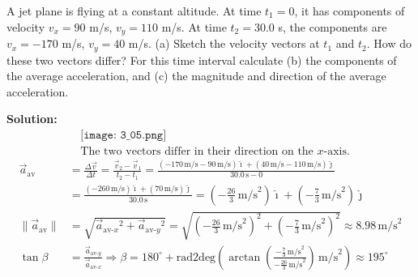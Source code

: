 \documentclass[12pt]{article}
\newenvironment{problem}[2][]{
    \begin{trivlist}
        \item[
            {\bfseries #1}
            {\bfseries #2}
        ]
}{\end{trivlist}}
\newcommand{\solution}{\medskip\noindent\textbf{Solution:}}
\newcommand{\magnitude}[1]{\lVert #1 \rVert}
\newcommand{\UVector}[2]{\left(#1\right)\ihat + \left(#2\right)\jhat}
\newcommand{\ihat}{\hat{\imath}}
\newcommand{\jhat}{\hat{\jmath}}
\newcommand{\radtodeg}[1]{\mbox{rad2deg}\left(#1\right)}
\newcommand{\unit}[1]{\, \text{#1}}
\newcommand{\mps}{\unit{m/s}}
\newcommand{\s}{\unit{s}}
\begin{document}
\begin{problem}{3.5}
    A jet plane is flying at a constant altitude.
    At time $t_1 = 0$, it has components of velocity $v_x = 90$ m/s, $v_y = 110$ m/s.
    At time $t_2 = 30.0$ s, the components are $v_x = -170$ m/s, $v_y = 40$ m/s.
    (a) Sketch the velocity vectors at $t_1$ and $t_2$.
    How do these two vectors differ?
    For this time interval calculate
    (b) the components of the average acceleration, and
    (c) the magnitude and direction of the average acceleration.

    \solution
    \begin{align*}
        &\texttt{[image: 3\_05.png]} \\
        &\text{The two vectors differ in their direction on the } x \text{-axis.}
    \end{align*}
    \begin{align}
        \vec{a}_{\text{av}} &= \frac{\Delta \vec{v}}{\Delta t} = \frac{\vec{v}_2 - \vec{v}_1}{t_2 - t_1} = \frac{\UVector{-170 \mps - 90 \mps}{40 \mps - 110 \mps}}{30.0 \s - 0} \\
        &= \frac{\UVector{-260 \mps}{70 \mps}}{30.0 \s} = \UVector{-\frac{26}{3} \mps^2}{-\frac{7}{3} \mps^2} \\
        \magnitude{\vec{a}_{\text{av}}} &= \sqrt{{\vec{a}_{\text{av-}x}}\phantom{}^2 + {\vec{a}_{\text{av-}y}}\phantom{}^2} = \sqrt{\left(-\frac{26}{3} \mps^2\right)^2 + \left(-\frac{7}{3} \mps^2\right)^2} \approx 8.98 \mps^2 \\
        \tan \beta &= \frac{\vec{a}_{\text{av-}y}}{\vec{a}_{\text{av-}x}} \Rightarrow \beta = 180^\circ + \radtodeg{\arctan\left(\frac{-\frac{7}{3} \mps^2}{-\frac{26}{3} \mps^2}\right) \mps^2} \approx 195^\circ
    \end{align}
\end{problem}

\clearpage
\end{document}

